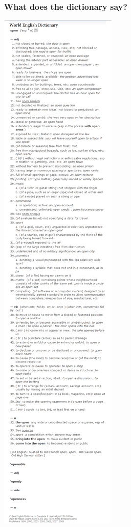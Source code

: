 \documentclass{beamer}
\begin{document}
\begin{frame}
  \frametitle{What does the dictionary say?}
  \begin{center}\includegraphics[height=0.8\textheight]{../img/dictionary}\end{center}
\end{frame}
\end{document}
